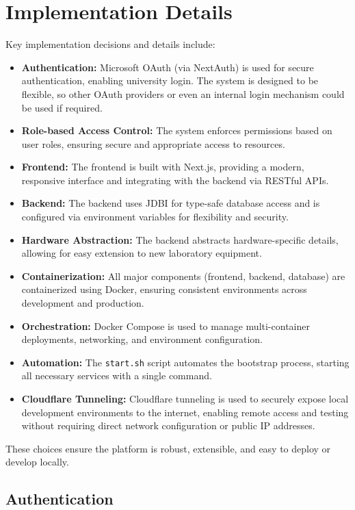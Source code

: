 \section{Implementation Details}

Key implementation decisions and details include:

\begin{itemize}
    \item \textbf{Authentication:} Microsoft OAuth (via NextAuth) is used for secure authentication, enabling university login. The system is designed to be flexible, so other OAuth providers or even an internal login mechanism could be used if required.
    \item \textbf{Role-based Access Control:} The system enforces permissions based on user roles, ensuring secure and appropriate access to resources.
    \item \textbf{Frontend:} The frontend is built with Next.js, providing a modern, responsive interface and integrating with the backend via RESTful APIs.
    \item \textbf{Backend:} The backend uses JDBI for type-safe database access and is configured via environment variables for flexibility and security.
    \item \textbf{Hardware Abstraction:} The backend abstracts hardware-specific details, allowing for easy extension to new laboratory equipment.
    \item \textbf{Containerization:} All major components (frontend, backend, database) are containerized using Docker, ensuring consistent environments across development and production.
    \item \textbf{Orchestration:} Docker Compose is used to manage multi-container deployments, networking, and environment configuration.
    \item \textbf{Automation:} The \texttt{start.sh} script automates the bootstrap process, starting all necessary services with a single command.
    \item \textbf{Cloudflare Tunneling:} Cloudflare tunneling is used to securely expose local development environments to the internet, enabling remote access and testing without requiring direct network configuration or public IP addresses.
\end{itemize}

These choices ensure the platform is robust, extensible, and easy to deploy or develop locally.

\subsection{Authentication}

